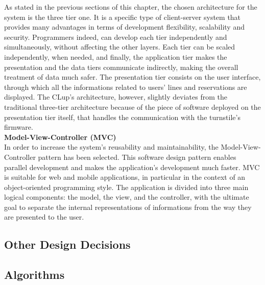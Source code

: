 \documentclass{article}
\begin{document}
\noindent As stated in the previous sections of this chapter, the chosen architecture for the system is the three tier one. It is a specific type of client-server system that provides many advantages in terms of development flexibility, scalability and security. Programmers indeed, can develop each tier independently and simultaneously, without affecting the other layers. Each tier can be scaled independently, when needed, and finally, the application tier makes the presentation and the data tiers communicate indirectly, making the overall treatment of data much safer. The presentation tier consists on the user interface, through which all the informations related to users’ lines and reservations are displayed. The CLup’s architecture, however, slightly deviates from the traditional three-tier architecture because of the piece of software deployed on the presentation tier itself, that handles the communication with the turnstile’s firmware.\\

\textbf{Model-View-Controller (MVC)}\\

\noindent In order to increase the system’s reusability and maintainability, the Model-View-Controller pattern has been selected. This software design pattern enables parallel development and makes the application’s development much faster. MVC is suitable for web and mobile applications, in particular in the context of an object-oriented programming style. The application is divided into three main logical components: the model, the view, and the controller, with the ultimate goal to separate the internal representations of informations from the way they are presented to the user.

\subsection{Other Design Decisions}
\subsection{Algorithms}
\end{document}

